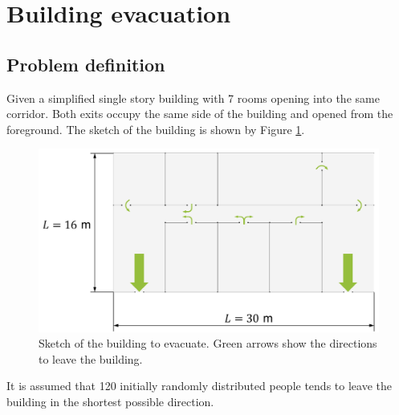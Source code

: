 \documentclass[a4paper,12pt,openany]{book}
\theoremstyle{break}
\begin{document}
\section{Building evacuation} \label{sec:SFM_example}
\subsection{Problem definition}
Given a simplified single story building with 7 rooms opening into the same corridor. Both exits occupy the same side of the building and opened from the foreground. The sketch of the building is shown by Figure \ref{fig:building_sketch}.
\begin{figure}[H]
  \includegraphics[scale=0.5]{building_sketch.pdf}
  \centering
  \caption{Sketch of the building to evacuate. Green arrows show the directions to leave the building.}
  \label{fig:building_sketch}
\end{figure}\vspace*{3pt}
It is assumed that 120 initially randomly distributed people tends to leave the building in the shortest possible direction.
\end{document}
